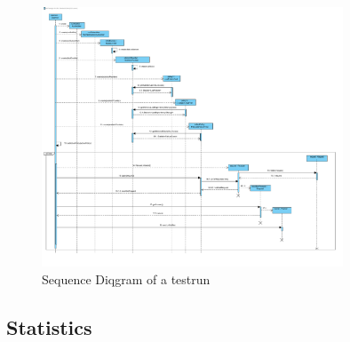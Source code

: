 \documentclass[i2]{oss}
\newcommand{\class}[1]{\emph{#1}}
\newcommand{\method}[1]{\emph{#1}}
\begin{document}




\begin{figure}[tbp]
\begin{center}
    \includegraphics[width=0.8\textwidth]{RunATestrun}
    \caption{Sequence Diqgram of a testrun}
	\label{fig:seq testrun}
\end{center}
\end{figure}



\subsection{Statistics}
\label{subssec: statistics}
\end{document}
